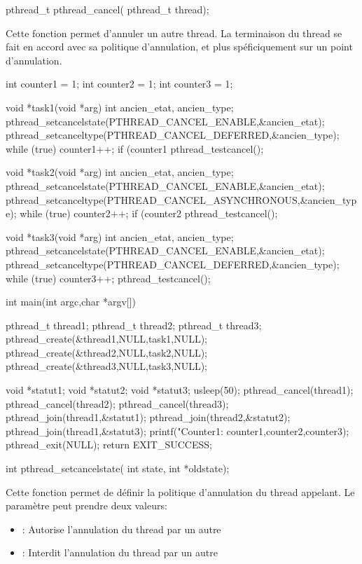 \label{func:pthread_cancel}

\begin{codeblock}
pthread_t pthread_cancel(
  pthread_t thread);
\end{codeblock}
Cette fonction permet d'annuler un autre thread. La terminaison du thread se fait en accord avec sa politique d'annulation, et plus spéficiquement sur un point d'annulation.
\begin{codeblock}
int counter1 = 1;
int counter2 = 1;
int counter3 = 1;

void *task1(void *arg) {
  int ancien_etat, ancien_type;
  pthread_setcancelstate(PTHREAD_CANCEL_ENABLE,&ancien_etat);
  pthread_setcanceltype(PTHREAD_CANCEL_DEFERRED,&ancien_type);
  while (true) {
    counter1++;
    if (counter1 %
      pthread_testcancel();
  }
}

void *task2(void *arg) {
  int ancien_etat, ancien_type;
  pthread_setcancelstate(PTHREAD_CANCEL_ENABLE,&ancien_etat);
  pthread_setcanceltype(PTHREAD_CANCEL_ASYNCHRONOUS,&ancien_type);
  while (true) {
    counter2++;
    if (counter2 %
      pthread_testcancel();
  }
}

void *task3(void *arg){
  int ancien_etat, ancien_type;
  pthread_setcancelstate(PTHREAD_CANCEL_ENABLE,&ancien_etat);
  pthread_setcanceltype(PTHREAD_CANCEL_DEFERRED,&ancien_type);
  while (true) {
    counter3++;
    pthread_testcancel();
  }
}

int main(int argc,char *argv[])
{
  pthread_t thread1;
  pthread_t thread2;
  pthread_t thread3;
  pthread_create(&thread1,NULL,task1,NULL);
  pthread_create(&thread2,NULL,task2,NULL);
  pthread_create(&thread3,NULL,task3,NULL);

  void *statut1;
  void *statut2;
  void *statut3;
  usleep(50);
  pthread_cancel(thread1);
  pthread_cancel(thread2);
  pthread_cancel(thread3);
  pthread_join(thread1,&statut1);
  pthread_join(thread2,&statut2);
  pthread_join(thread1,&statut3);
  printf("Counter1: %
          counter1,counter2,counter3);
  pthread_exit(NULL);
  return EXIT_SUCCESS;
}
\end{codeblock}


\label{func:pthread_setcancelstate}

\begin{codeblock}
int pthread_setcancelstate(
  int state,
  int *oldstate);
\end{codeblock}
Cette fonction permet de définir la politique d'annulation du thread appelant. Le paramètre  peut prendre deux valeurs:
\begin{itemize}
  \item {}: Autorise l'annulation du thread par un autre
  \item {}: Interdit l'annulation du thread par un autre
\end{itemize}


